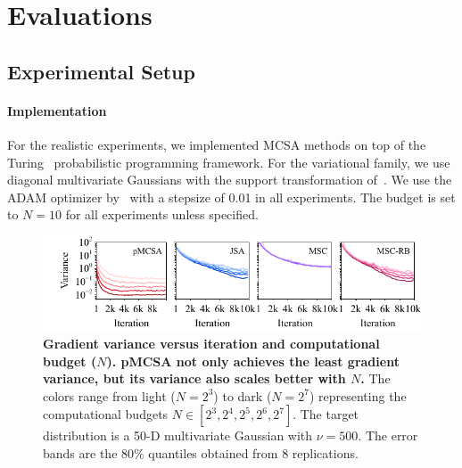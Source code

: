 

\section{Evaluations}\label{section:eval}
\vspace{-0.1in}
\subsection{Experimental Setup}
\paragraph{Implementation}
For the realistic experiments, we implemented MCSA methods on top of the Turing~\citep{ge2018t} probabilistic programming framework.%
For the variational family, we use diagonal multivariate Gaussians with the support transformation of~\citet{JMLR:v18:16-107}.
We use the ADAM optimizer by~\citet{kingma_adam_2015} with a stepsize of 0.01 in all experiments.
The budget is set to \(N=10\) for all experiments unless specified.

\begin{figure}[t]
  \vspace{-2ex}
  \centering
  \includegraphics[scale=1.0]{figures/gaussian_03.pdf}
  \caption{\textbf{Gradient variance versus iteration and computational budget (\(N\)).
      pMCSA not only achieves the least gradient variance, but its variance also scales better with \(N\).
    }
    The colors range from light (\(N=2^3\)) to dark (\(N=2^7\)) representing the computational budgets \(N \in [2^3, 2^4, 2^5, 2^6, 2^7]\).
    The target distribution is a 50-D multivariate Gaussian with \(\nu = 500\).
    The error bands are the 80\% quantiles obtained from 8 replications.
  }\label{fig:gaussian}
\end{figure}

